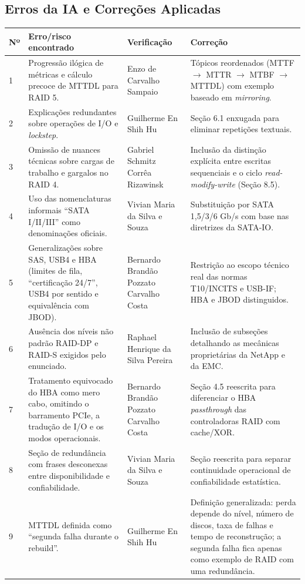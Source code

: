 \documentclass[11pt,a4paper]{article}
\begin{document}
\subsection{Erros da IA e Correções Aplicadas}
\begin{longtable}{@{}p{.7cm}p{5cm}p{4.4cm}p{4.6cm}@{}}\toprule
\textbf{Nº} & \textbf{Erro/risco encontrado} & \textbf{Verificação} & \textbf{Correção}\\\midrule\endhead
1 & Progressão ilógica de métricas e cálculo precoce de MTTDL para RAID 5. & Enzo de Carvalho Sampaio & Tópicos reordenados (MTTF $\rightarrow$ MTTR $\rightarrow$ MTBF $\rightarrow$ MTTDL) com exemplo baseado em \textit{mirroring}.\\
2 & Explicações redundantes sobre operações de I/O e \textit{lockstep}. & Guilherme En Shih Hu & Seção 6.1 enxugada para eliminar repetições textuais.\\
3 & Omissão de nuances técnicas sobre cargas de trabalho e gargalos no RAID 4. & Gabriel Schmitz Corrêa Rizawinsk & Inclusão da distinção explícita entre escritas sequenciais e o ciclo \textit{read-modify-write} (Seção 8.5).\\
4 & Uso das nomenclaturas informais ``SATA I/II/III'' como denominações oficiais. & Vivian Maria da Silva e Souza & Substituição por SATA 1,5/3/6 Gb/s com base nas diretrizes da SATA-IO.\\
5 & Generalizações sobre SAS, USB4 e HBA (limites de fila, ``certificação 24/7'', USB4 por sentido e equivalência com JBOD). & Bernardo Brandão Pozzato Carvalho Costa & Restrição ao escopo técnico real das normas T10/INCITS e USB-IF; HBA e JBOD distinguidos.\\
6 & Ausência dos níveis não padrão RAID-DP e RAID-S exigidos pelo enunciado. & Raphael Henrique da Silva Pereira & Inclusão de subseções detalhando as mecânicas proprietárias da NetApp e da EMC.\\
7 & Tratamento equivocado do HBA como mero cabo, omitindo o barramento PCIe, a tradução de I/O e os modos operacionais. & Bernardo Brandão Pozzato Carvalho Costa & Seção 4.5 reescrita para diferenciar o HBA \textit{passthrough} das controladoras RAID com cache/XOR.\\
8 & Seção de redundância com frases desconexas entre disponibilidade e confiabilidade. & Vivian Maria da Silva e Souza & Seção reescrita para separar continuidade operacional de confiabilidade estatística.\\
9 & MTTDL definida como ``segunda falha durante o rebuild''. &  Guilherme En Shih Hu & Definição generalizada: perda depende do nível, número de discos, taxa de falhas e tempo de reconstrução; a segunda falha fica apenas como exemplo de RAID com uma redundância.\\

\end{longtable}
\end{document}
